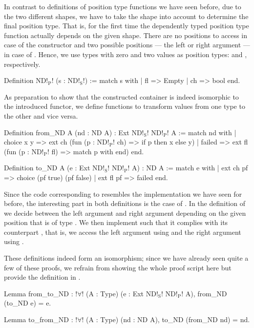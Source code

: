In contrast to definitions of position type functions we have seen before, due to the two different shapes, we have to take the shape into account to determine the final position type.
That is, for the first time the dependently typed position type function actually depends on the given shape.
There are no positions to access in case of the  constructor and two possible positions --- the left or right argument --- in case of .
Hence, we use types with zero and two values as position types:  and , respectively.

\begin{coqcode}
Definition ND!$_\text{P}$! (s : ND!$_\text{S}$!) :=
 match s with
 | fl => Empty
 | ch => bool
 end.
\end{coqcode}

As preparation to show that the constructed container is indeed isomorphic to the introduced functor, we define functions to transform values from one type to the other and vice versa.

\begin{coqcode}
Definition from_ND A (nd : ND A) : Ext ND!$_\text{S}$! ND!$_\text{P}$! A :=
 match nd with
 | choice x y => ext ch (fun (p : ND!$_\text{P}$! ch) => if p then x else y)
 | failed     => ext fl (fun (p : ND!$_\text{P}$! fl) => match p with end)
 end.

Definition to_ND A (e : Ext ND!$_\text{S}$! ND!$_\text{P}$! A) : ND A :=
 match e with
 | ext ch pf => choice (pf true) (pf false)
 | ext fl pf => failed
 end.
\end{coqcode}

Since the code corresponding to  resembles the implementation we have seen for  before, the interesting part in both definitions is the case of .
In the definition of  we decide between the left argument  and right argument  depending on the given position  that is of type .
We then implement  such that it complies with its counterpart , that is, we access the left argument using  and the right argument using .

These definitions indeed form an isomorphism; since we have already seen quite a few of these proofs, we refrain from showing the whole
proof script here but provide the definition in .

\begin{coqcode}
Lemma from_to_ND : !$\forall$! (A : Type) (e : Ext ND!$_\text{S}$! ND!$_\text{P}$! A),
   from_ND (to_ND e) = e.

Lemma to_from_ND : !$\forall$! (A : Type) (nd : ND A),
   to_ND (from_ND nd) = nd.
\end{coqcode}

